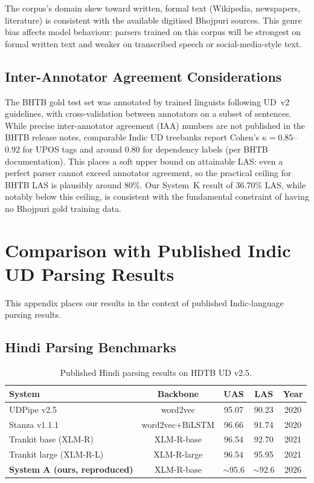 \documentclass[12pt,a4paper,oneside]{report}
\begin{document}
The corpus's domain skew toward written, formal text (Wikipedia, newspapers,
literature) is consistent with the available digitised Bhojpuri sources. This
genre bias affects model behaviour: parsers trained on this corpus will be
strongest on formal written text and weaker on transcribed speech or
social-media-style text.

\section{Inter-Annotator Agreement Considerations}

The BHTB gold test set was annotated by trained linguists following UD~v2
guidelines, with cross-validation between annotators on a subset of sentences.
While precise inter-annotator agreement (IAA) numbers are not published in
the BHTB release notes, comparable Indic UD treebanks report Cohen's
$\kappa = 0.85$--$0.92$ for UPOS tags and around 0.80 for dependency labels
(per BHTB documentation). This places a soft upper bound on attainable LAS:
even a perfect parser cannot exceed annotator agreement, so the practical
ceiling for BHTB LAS is plausibly around 80\%. Our System~K result of
36.70\% LAS, while notably below this ceiling, is consistent with the
fundamental constraint of having no Bhojpuri gold training data.


\chapter{Comparison with Published Indic UD Parsing Results}
\label{app:indic_compare}

This appendix places our results in the context of published Indic-language
parsing results.

\section{Hindi Parsing Benchmarks}

\begin{table}[ht]
\centering
\caption{Published Hindi parsing results on HDTB UD v2.5.}
\label{tab:hindi_compare}
\begin{tabular}{@{}lcccc@{}}
\toprule
\textbf{System} & \textbf{Backbone} & \textbf{UAS} & \textbf{LAS} & \textbf{Year} \\
\midrule
UDPipe v2.5             & word2vec      & 95.07 & 90.23 & 2020 \\
Stanza v1.1.1           & word2vec+BiLSTM & 96.66 & 91.74 & 2020 \\
Trankit base (XLM-R)    & XLM-R-base    & 96.54 & 92.70 & 2021 \\
Trankit large (XLM-R-L) & XLM-R-large   & 96.54 & 95.95 & 2021 \\
\textbf{System A (ours, reproduced)} & XLM-R-base & ${\sim}95.6$ & ${\sim}92.6$ & 2026 \\
\bottomrule
\end{tabular}
\end{table}
\end{document}
